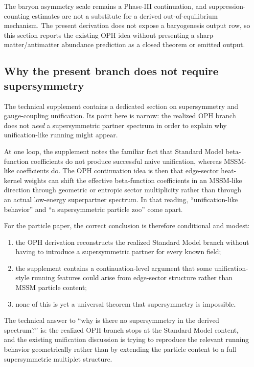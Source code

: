 \documentclass[11pt]{article}
\begin{document}
The baryon asymmetry scale remains a Phase-III continuation, and suppression-counting estimates are
not a substitute for a derived out-of-equilibrium mechanism. The present derivation
does not expose a baryogenesis output row, so this section reports the existing OPH idea
without presenting a sharp matter/antimatter abundance prediction as a closed theorem or emitted output.

\subsection{Why the present branch does not require supersymmetry}

The technical supplement contains a dedicated section on supersymmetry and gauge-coupling
unification. Its point here is narrow: the realized OPH branch does not \emph{need} a
supersymmetric partner spectrum in order to explain why unification-like running might appear.

At one loop, the supplement notes the familiar fact that Standard Model beta-function
coefficients do not produce successful naive unification, whereas MSSM-like coefficients do. The
OPH continuation idea is then that edge-sector heat-kernel weights can shift the effective
beta-function coefficients in an MSSM-like direction through geometric or entropic sector
multiplicity rather than through an actual low-energy superpartner spectrum. In that reading,
``unification-like behavior'' and ``a supersymmetric particle zoo'' come apart.

For the particle paper, the correct conclusion is therefore conditional and modest:
\begin{enumerate}[leftmargin=2em]
\item the OPH derivation reconstructs the realized Standard Model branch without having to
introduce a supersymmetric partner for every known field;
\item the supplement contains a continuation-level argument that some unification-style running
features could arise from edge-sector structure rather than MSSM particle content;
\item none of this is yet a universal theorem that supersymmetry is impossible.
\end{enumerate}

The technical answer to ``why is there no supersymmetry in the derived spectrum?'' is: the realized OPH branch stops at the Standard
Model content, and the existing unification discussion is trying to reproduce the relevant
running behavior geometrically rather than by extending the particle content to a full
supersymmetric multiplet structure.
\end{document}
